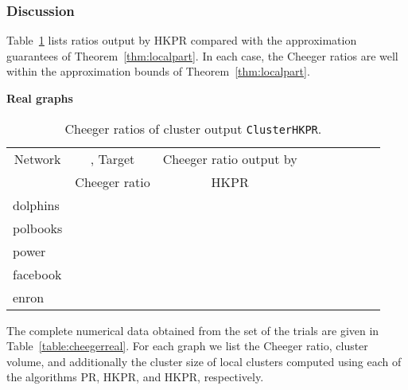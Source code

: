 \documentclass[runningheads,a4paper]{llncs}
\newcommand{\partitionalg}{\texttt{ClusterHKPR}}
\begin{document}
\subsubsection{Discussion}
Table~\ref{table:realhkprclusterresults} lists ratios output by HKPR compared with the approximation guarantees of
Theorem~\ref{thm:localpart}.  In each case, the Cheeger ratios are well within
the approximation bounds of Theorem~\ref{thm:localpart}.

\begin{table}
\centering
\textbf{Real graphs}\\
\begin{tabular}{|p{2cm}|c|c|c|}
\hline
\multicolumn{1}{|c|}{Network} & , Target & Cheeger ratio output by &
~~~~~~~~~~\\
        & Cheeger ratio & HKPR & \\
\hline\hline
dolphins &  &  &  \\
polbooks &  &  & \\
power    &  &  &  \\
facebook &  &  &  \\
enron    &  &  & \\
\hline 
\end{tabular}
\caption{Cheeger ratios of cluster output \partitionalg.}
\label{table:realhkprclusterresults}
\end{table}

The complete numerical data obtained from the set of the trials are given in
Table~\ref{table:cheegerreal}.  For each graph we list the Cheeger ratio,
cluster volume, and additionally the cluster size of local clusters computed
using each of the algorithms PR, HKPR, and HKPR, respectively.
\end{document}
